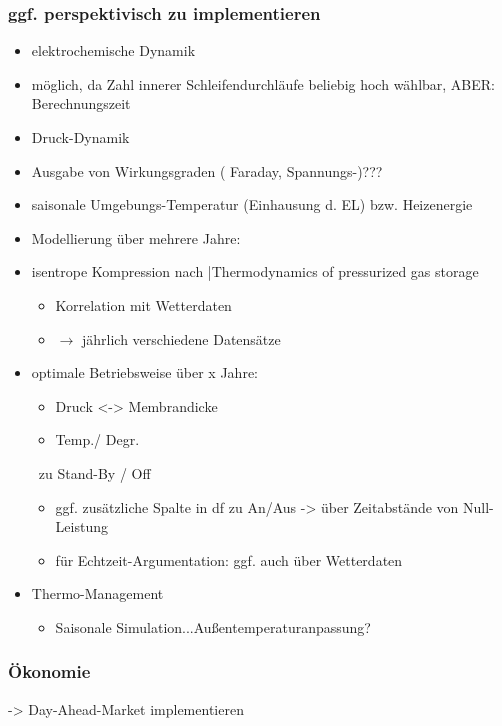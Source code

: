 \documentclass[onecolumn,10pt,titlepage]{article}
\begin{document}
\subsubsection{ggf. perspektivisch zu implementieren}
\begin{itemize}
	\item elektrochemische Dynamik
	\item[] möglich, da Zahl innerer Schleifendurchläufe beliebig hoch wählbar, ABER: Berechnungszeit
	\item Druck-Dynamik
	\item Ausgabe von Wirkungsgraden ( Faraday, Spannungs-)???
	\item saisonale Umgebungs-Temperatur (Einhausung d. EL) bzw. Heizenergie
	\item Modellierung über mehrere Jahre:
	\item isentrope Kompression nach |Thermodynamics of pressurized gas storage
	\begin{itemize}
		\item Korrelation mit Wetterdaten
		\item[] $\rightarrow$ jährlich verschiedene Datensätze
	\end{itemize}	
	\item optimale Betriebsweise über x Jahre:
	\begin{itemize}
		\item Druck <-> Membrandicke
		\item Temp./ Degr.
		
	\end{itemize}
	\ zu Stand-By / Off
	\begin{itemize}
		\item ggf. zusätzliche Spalte in df zu An/Aus -> über Zeitabstände von Null-Leistung
		\item für Echtzeit-Argumentation: ggf. auch über Wetterdaten %
	\end{itemize} 
	\item Thermo-Management
	\begin{itemize}
		\item Saisonale Simulation...Außentemperaturanpassung?
	\end{itemize}
\end{itemize}
\subsubsection{Ökonomie}
-> Day-Ahead-Market implementieren 
\end{document}
